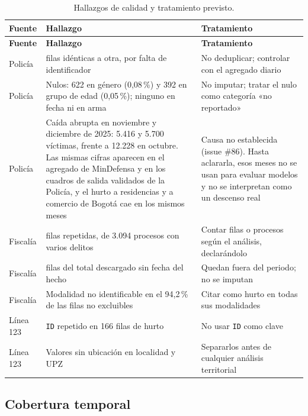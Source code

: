 \documentclass[12pt,letterpaper]{article}
\begin{document}
{\small
\setlength{\tabcolsep}{4pt}
\begin{longtable}{@{}>{\raggedright\arraybackslash}p{2.2cm}>{\raggedright\arraybackslash}p{6.6cm}>{\raggedright\arraybackslash}p{6.5cm}@{}}
\caption{Hallazgos de calidad y tratamiento previsto.}\label{tab:calidad}\\
\toprule
\textbf{Fuente} & \textbf{Hallazgo} & \textbf{Tratamiento} \\
\midrule
\endfirsthead
\toprule
\textbf{Fuente} & \textbf{Hallazgo} & \textbf{Tratamiento} \\
\midrule
\endhead
\bottomrule
\endfoot
Policía & 713.344 filas idénticas a otra, por falta de identificador & No deduplicar; controlar con el agregado diario \\
\addlinespace
Policía & Nulos: 622 en género (0,08\,\%) y 392 en grupo de edad (0,05\,\%); ninguno en fecha ni en arma & No imputar; tratar el nulo como categoría «no reportado» \\
\addlinespace
Policía & Caída abrupta en noviembre y diciembre de 2025: 5.416 y 5.700 víctimas, frente a 12.228 en octubre. Las mismas cifras aparecen en el agregado de MinDefensa y en los cuadros de salida validados de la Policía, y el hurto a residencias y a comercio de Bogotá cae en los mismos meses & Causa no establecida (issue \#86). Hasta aclararla, esos meses no se usan para evaluar modelos y no se interpretan como un descenso real \\
\addlinespace
Fiscalía & 3.661 filas repetidas, de 3.094 procesos con varios delitos & Contar filas o procesos según el análisis, declarándolo \\
\addlinespace
Fiscalía & 767 filas del total descargado sin fecha del hecho & Quedan fuera del periodo; no se imputan \\
\addlinespace
Fiscalía & Modalidad no identificable en el 94,2\,\% de las filas no excluibles & Citar como hurto en todas sus modalidades \\
\addlinespace
Línea 123 & \texttt{ID} repetido en 166 filas de hurto & No usar \texttt{ID} como clave \\
\addlinespace
Línea 123 & Valores sin ubicación en localidad y UPZ & Separarlos antes de cualquier análisis territorial \\
\end{longtable}
}

\subsection{Cobertura temporal}
\end{document}
